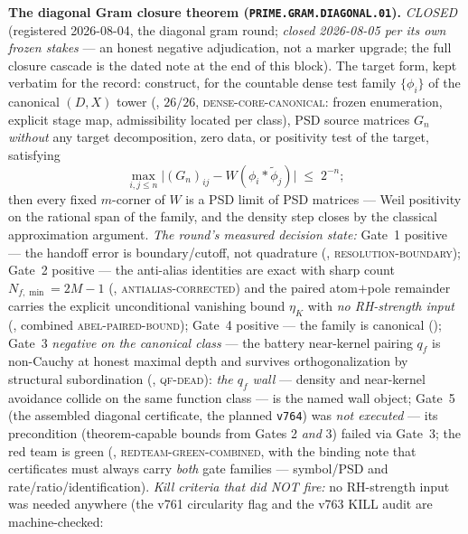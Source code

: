 \documentclass[11pt,a4paper]{article}
\begin{document}
\par\smallskip\noindent\textbf{The diagonal Gram closure theorem
(\texttt{PRIME.GRAM.DIAGONAL.01}).}
{\sloppy
\emph{CLOSED} (registered 2026-08-04, the diagonal gram round;
\emph{closed 2026-08-05 per its own frozen stakes} --- an honest
negative adjudication, not a marker upgrade; the full closure
cascade is the dated note at the end of this block).  The target
form, kept verbatim for the record:
construct, for the countable dense test family $\{\phi_i\}$ of the
canonical $(D,X)$ tower (, $26/26$,
\textsc{dense-core-canonical}: frozen enumeration, explicit stage
map, admissibility located per class), PSD source matrices $G_n$
\emph{without} any target decomposition, zero data, or positivity
test of the target, satisfying
\[
  \max_{i,j\le n}\bigl|(G_n)_{ij}-W(\phi_i\ast\tilde\phi_j)\bigr|
  \;\le\; 2^{-n};
\]
then every fixed $m$-corner of $W$ is a PSD limit of PSD matrices
--- Weil positivity on the rational span of the family, and the
density step closes by the classical approximation argument.
\emph{The round's measured decision state:} Gate~1 positive ---
the handoff error is boundary/cutoff, not quadrature
(,
\textsc{resolution-boundary}); Gate~2 positive --- the anti-alias
identities are exact with sharp count $N_{f,\min}=2M{-}1$
(, \textsc{antialias-corrected})
and the paired atom$+$pole remainder carries the explicit
unconditional vanishing bound $\eta_K$ with \emph{no RH-strength
input} (, combined
\textsc{abel-paired-bound}); Gate~4 positive --- the family is
canonical (); Gate~3
\emph{negative on the canonical class} --- the battery near-kernel
pairing $q_f$ is non-Cauchy at honest maximal depth and survives
orthogonalization by structural subordination
(, \textsc{qf-dead}): \emph{the
$q_f$ wall} --- density and near-kernel avoidance collide on the
same function class --- is the named wall object; Gate~5 (the
assembled diagonal certificate, the planned \texttt{v764}) was
\emph{not executed} --- its precondition (theorem-capable bounds
from Gates 2 \emph{and} 3) failed via Gate~3; the red team is green
(,
\textsc{redteam-green-combined}, with the binding note that
certificates must always carry \emph{both} gate families ---
symbol/PSD and rate/ratio/identification).  \emph{Kill criteria
that did NOT fire:} no RH-strength input was needed anywhere (the
v761 circularity flag and the v763 KILL audit are machine-checked:
}
\end{document}
